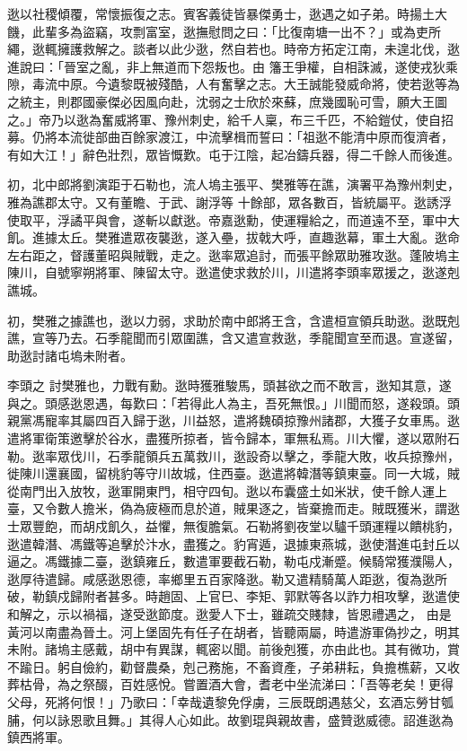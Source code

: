 \begin{pinyinscope}
 逖以社稷傾覆，常懷振復之志。賓客義徒皆暴傑勇士，逖遇之如子弟。時揚土大饑，此輩多為盜竊，攻剽富室，逖撫慰問之曰：「比復南塘一出不？」或為吏所繩，逖輒擁護救解之。談者以此少逖，然自若也。時帝方拓定江南，未遑北伐，逖進說曰：「晉室之亂，非上無道而下怨叛也。由
 籓王爭權，自相誅滅，遂使戎狄乘隙，毒流中原。今遺黎既被殘酷，人有奮擊之志。大王誠能發威命將，使若逖等為之統主，則郡國豪傑必因風向赴，沈弱之士欣於來蘇，庶幾國恥可雪，願大王圖之。」帝乃以逖為奮威將軍、豫州刺史，給千人稟，布三千匹，不給鎧仗，使自招募。仍將本流徙部曲百餘家渡江，中流擊楫而誓曰：「祖逖不能清中原而復濟者，有如大江！」辭色壯烈，眾皆慨歎。屯于江陰，起冶鑄兵器，得二千餘人而後進。



 初，北中郎將劉演距于石勒也，流人塢主張平、樊雅等在譙，演署平為豫州刺史，雅為譙郡太守。又有董瞻、于武、謝浮等
 十餘部，眾各數百，皆統屬平。逖誘浮使取平，浮譎平與會，遂斬以獻逖。帝嘉逖勳，使運糧給之，而道遠不至，軍中大飢。進據太丘。樊雅遣眾夜襲逖，遂入壘，拔戟大呼，直趣逖幕，軍土大亂。逖命左右距之，督護董昭與賊戰，走之。逖率眾追討，而張平餘眾助雅攻逖。蓬陂塢主陳川，自號寧朔將軍、陳留太守。逖遣使求救於川，川遣將李頭率眾援之，逖遂剋譙城。



 初，樊雅之據譙也，逖以力弱，求助於南中郎將王含，含遣桓宣領兵助逖。逖既剋譙，宣等乃去。石季龍聞而引眾圍譙，含又遣宣救逖，季龍聞宣至而退。宣遂留，助逖討諸屯塢未附者。



 李頭之
 討樊雅也，力戰有勳。逖時獲雅駿馬，頭甚欲之而不敢言，逖知其意，遂與之。頭感逖恩遇，每歎曰：「若得此人為主，吾死無恨。」川聞而怒，遂殺頭。頭親黨馮寵率其屬四百入歸于逖，川益怒，遣將魏碩掠豫州諸郡，大獲子女車馬。逖遣將軍衛策邀擊於谷水，盡獲所掠者，皆令歸本，軍無私焉。川大懼，遂以眾附石勒。逖率眾伐川，石季龍領兵五萬救川，逖設奇以擊之，季龍大敗，收兵掠豫州，徙陳川還襄國，留桃豹等守川故城，住西臺。逖遣將韓潛等鎮東臺。同一大城，賊從南門出入放牧，逖軍開東門，相守四旬。逖以布囊盛土如米狀，使千餘人運上
 臺，又令數人擔米，偽為疲極而息於道，賊果逐之，皆棄擔而走。賊既獲米，謂逖士眾豐飽，而胡戍飢久，益懼，無復膽氣。石勒將劉夜堂以驢千頭運糧以饋桃豹，逖遣韓潛、馮鐵等追擊於汴水，盡獲之。豹宵遁，退據東燕城，逖使潛進屯封丘以逼之。馮鐵據二臺，逖鎮雍丘，數遣軍要截石勒，勒屯戍漸蹙。候騎常獲濮陽人，逖厚待遣歸。咸感逖恩德，率鄉里五百家降逖。勒又遣精騎萬人距逖，復為逖所破，勒鎮戍歸附者甚多。時趙固、上官巳、李矩、郭默等各以詐力相攻擊，逖遣使和解之，示以禍福，遂受逖節度。逖愛人下士，雖疏交賤隸，皆恩禮遇之，
 由是黃河以南盡為晉土。河上堡固先有任子在胡者，皆聽兩屬，時遣游軍偽抄之，明其未附。諸塢主感戴，胡中有異謀，輒密以聞。前後剋獲，亦由此也。其有微功，賞不踰日。躬自儉約，勸督農桑，剋己務施，不畜資產，子弟耕耘，負擔樵薪，又收葬枯骨，為之祭醊，百姓感悅。嘗置酒大會，耆老中坐流涕曰：「吾等老矣！更得父母，死將何恨！」乃歌曰：「幸哉遺黎免俘虜，三辰既朗遇慈父，玄酒忘勞甘瓠脯，何以詠恩歌且舞。」其得人心如此。故劉琨與親故書，盛贊逖威德。詔進逖為鎮西將軍。




\end{pinyinscope}

